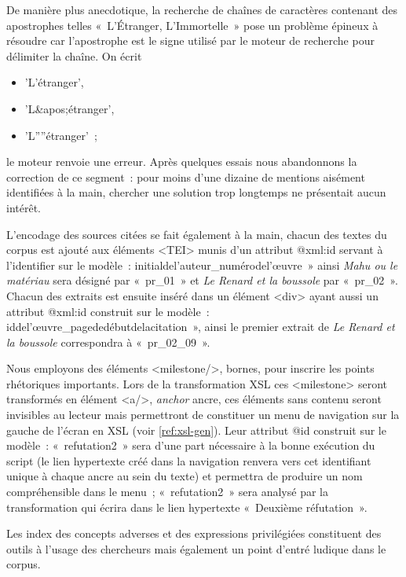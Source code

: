 \documentclass[12pt, a4paper]{article}
\begin{document}
De manière plus anecdotique, la recherche de chaînes de caractères contenant des apostrophes telles «~L'Étranger, L'Immortelle~» pose un problème épineux à résoudre car l'apostrophe est le signe utilisé par le moteur de recherche pour délimiter la chaîne. On écrit 
\begin{itemize}
    \item 'L'étranger', 
    \item 'L\&apos;étranger',
    \item 'L''''étranger'~; 
\end{itemize}
le moteur renvoie une erreur. Après quelques essais nous abandonnons la correction de ce segment~: pour moins d'une dizaine de mentions aisément identifiées à la main, chercher une solution trop longtemps ne présentait aucun intérêt.


L'encodage des sources citées se fait également à la main, chacun des textes du corpus est ajouté aux éléments <TEI> munis d'un attribut @xml\NoAutoSpaceBeforeFDP:id servant à l'identifier sur le modèle~: initialdel'auteur\_numérodel'œuvre~» ainsi \textit{Mahu ou le matériau} sera désigné par «~pr\_01~» et \textit{Le Renard et la boussole} par «~pr\_02~». Chacun des extraits est ensuite inséré dans un élément <div> ayant aussi un attribut @xml\NoAutoSpaceBeforeFDP:id construit sur le modèle~: iddel'œuvre\_pagededébutdelacitation~», ainsi le premier extrait de \textit{Le Renard et la boussole} correspondra à «~pr\_02\_09~».    

\label{encMilestone} Nous employons des éléments <milestone/>, bornes, pour inscrire les points rhétoriques importants. Lors de la transformation XSL ces <milestone> seront transformés en élément <a/>, \textit{anchor} ancre, ces éléments sans contenu seront invisibles au lecteur mais permettront de constituer un menu de navigation sur la gauche de l'écran en XSL (voir \ref{ref:xsl-gen}). Leur attribut @id construit sur le modèle~: «~refutation2~»
sera d'une part nécessaire à la bonne exécution du script (le lien hypertexte créé dans la navigation renvera vers cet identifiant unique à chaque ancre au sein du texte) et permettra de produire un nom compréhensible dans le menu~; «~refutation2~» sera analysé par la transformation qui écrira dans le lien hypertexte «~Deuxième réfutation~».



Les index des concepts adverses et des expressions privilégiées constituent des outils à l'usage des chercheurs mais également un point d'entré ludique dans le corpus.
\end{document}
